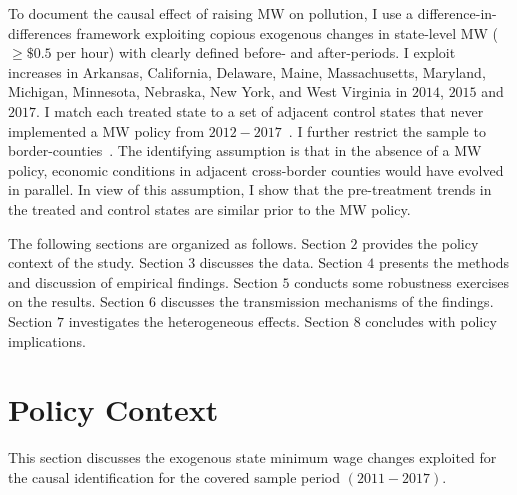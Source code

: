 \documentclass[12pt, english]{article}
\begin{document}
    To document the causal effect of raising MW on pollution, I use a difference-in-differences framework exploiting copious exogenous changes in state-level MW ($\geq \$0.5$ per hour) with clearly defined before- and after-periods. I exploit increases in Arkansas, California, Delaware, Maine, Massachusetts, Maryland, Michigan, Minnesota, Nebraska, New York, and West Virginia in $2014$, $2015$ and $2017$. I match each treated state to a set of adjacent control states that never implemented a MW policy from $2012-2017$~\parencite{gopalan2021state}. I further restrict the sample to border-counties~\parencite{dube2010minimum}. The identifying assumption is that in the absence of a MW policy, economic conditions in adjacent cross-border counties would have evolved in parallel. In view of this assumption, I show that the pre-treatment trends in the treated and control states are similar prior to the MW policy.

    

    The following sections are organized as follows. Section $2$ provides the policy context of the study. Section $3$ discusses the data. Section $4$ presents the methods and discussion of empirical findings. Section $5$ conducts some robustness exercises on the results. Section $6$ discusses the transmission mechanisms of the findings. Section $7$ investigates the heterogeneous effects. Section $8$ concludes with policy implications.


    \section{Policy Context}\label{sec:policy-context}
    This section discusses the exogenous state minimum wage changes exploited for the causal identification for the covered sample period $(2011-2017)$.
\end{document}
